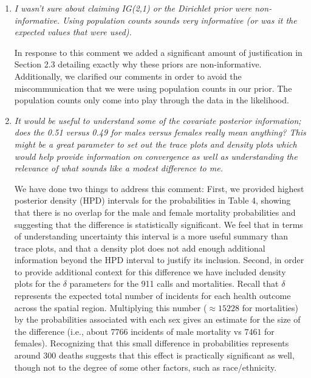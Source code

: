 \documentclass{article}
\begin{document}
\begin{enumerate}
\item\textit{I wasn't sure about claiming IG(2,1) or the Dirichlet prior were non-informative.   Using population counts sounds very informative (or was it the expected values that were used).}

In response to this comment we added a significant amount of justification in Section 2.3 detailing exactly why these priors are non-informative. Additionally, we clarified our comments in order to avoid the miscommunication that we were using population counts in our prior. The population counts only come into play through the data in the likelihood.

\item\textit{It would be useful to understand some of the covariate posterior information; does the 0.51 versus 0.49 for males versus females really mean anything? This might be a great parameter to set out the trace plots and density plots which would help provide information on convergence as well as understanding the relevance of what sounds like a modest difference to me.}

We have done two things to address this comment: First, we provided highest posterior density (HPD) intervals for the probabilities in Table 4, showing that there is no overlap for the male and female mortality probabilities and suggesting that the difference is statistically significant. We feel that in terms of understanding uncertainty this interval is a more useful summary than trace plots, and that a density plot does not add enough additional information beyond the HPD interval to justify its inclusion. Second, in order to provide additional context for this difference we have included density plots for the $\delta$ parameters for the 911 calls and mortalities. Recall that $\delta$ represents the expected total number of incidents for each health outcome across the spatial region. Multiplying this number ($\approx 15228$ for mortalities) by the probabilities associated with each sex gives an estimate for the size of the difference (i.e., about $7766$ incidents of male mortality vs $7461$ for females). Recognizing that this small difference in probabilities represents around 300 deaths suggests that this effect is practically significant as well, though not to the degree of some other factors, such as race/ethnicity. 



\end{enumerate}
\end{document}
